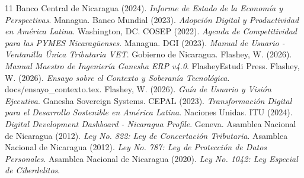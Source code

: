\documentclass[12pt, a4paper]{article}
\begin{document}
\newpage
\begin{thebibliography}{11}
Banco Central de Nicaragua (2024). \textit{Informe de Estado de la Economía y Perspectivas}. Managua.
Banco Mundial (2023). \textit{Adopción Digital y Productividad en América Latina}. Washington, DC.
COSEP (2022). \textit{Agenda de Competitividad para las PYMES Nicaragüenses}. Managua.
DGI (2023). \textit{Manual de Usuario - Ventanilla Única Tributaria VET}. Gobierno de Nicaragua.
Flashey, W. (2026). \textit{Manual Maestro de Ingeniería Ganesha ERP v4.0}. FlasheyEstudi Press.
Flashey, W. (2026). \textit{Ensayo sobre el Contexto y Soberanía Tecnológica}. docs/ensayo\_contexto.tex.
Flashey, W. (2026). \textit{Guía de Usuario y Visión Ejecutiva}. Ganesha Sovereign Systems.
CEPAL (2023). \textit{Transformación Digital para el Desarrollo Sostenible en América Latina}. Naciones Unidas.
ITU (2024). \textit{Digital Development Dashboard - Nicaragua Profile}. Geneva.
Asamblea Nacional de Nicaragua (2012). \textit{Ley No. 822: Ley de Concertación Tributaria}.
Asamblea Nacional de Nicaragua (2012). \textit{Ley No. 787: Ley de Protección de Datos Personales}.
Asamblea Nacional de Nicaragua (2020). \textit{Ley No. 1042: Ley Especial de Ciberdelitos}.
\end{thebibliography}
\end{document}
